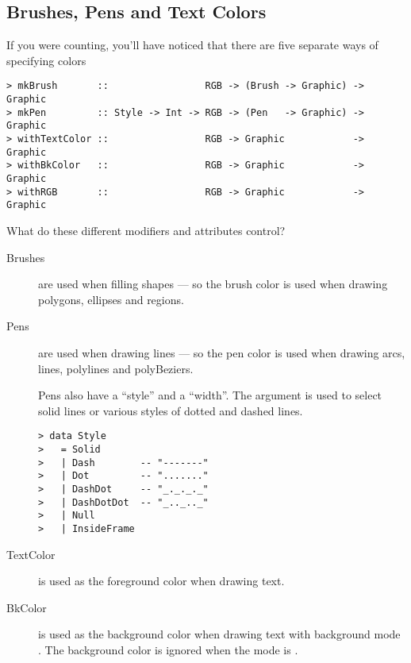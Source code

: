 \subsection{Brushes, Pens and Text Colors}

If you were counting, you'll have noticed that there are five separate
ways of specifying colors

\begin{verbatim}
> mkBrush       ::                 RGB -> (Brush -> Graphic) -> Graphic
> mkPen         :: Style -> Int -> RGB -> (Pen   -> Graphic) -> Graphic
> withTextColor ::                 RGB -> Graphic            -> Graphic
> withBkColor   ::                 RGB -> Graphic            -> Graphic
> withRGB       ::                 RGB -> Graphic            -> Graphic
\end{verbatim}

What do these different modifiers and attributes control?

\begin{description}
\item[Brushes] 
  are used when filling shapes --- so the brush color is
  used when drawing polygons, ellipses and regions.

\item[Pens]
  are used when drawing lines --- so the pen color is used
  when drawing arcs, lines, polylines and polyBeziers.

  Pens also have a ``style'' and a ``width''.  The 
  argument is used to select solid lines or various styles of
  dotted and dashed lines.

\begin{verbatim}
> data Style
>   = Solid 
>   | Dash        -- "-------"
>   | Dot         -- "......."  
>   | DashDot     -- "_._._._"  
>   | DashDotDot  -- "_.._.._"  
>   | Null
>   | InsideFrame
\end{verbatim}

\item[TextColor]
  is used as the foreground color when drawing text.

\item[BkColor]
  is used as the background color when drawing text with
  background mode .  The background color is
  ignored when the mode is .
  

\end{description}

